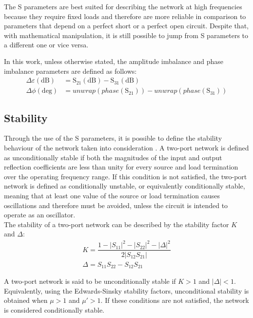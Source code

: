 The S parameters are best suited for describing the network at high frequencies because they require fixed loads and therefore are more reliable in comparison to parameters that depend on a perfect short or a perfect open circuit. Despite that, with mathematical manipulation, it is still possible to jump from S parameters to a different one or vice versa.

In this work, unless otherwise stated, the amplitude imbalance and phase imbalance parameters are defined as follows:
\begin{align}
    \Delta \varepsilon(\mathrm{dB})&=\mathrm{S}_{21}(\mathrm{dB})-\mathrm{S}_{31}(\mathrm{dB})\\
    \label{eq:DiffGainBalanceSports}
    \Delta \phi(\mathrm{deg})&=unwrap(phase(\mathrm{S}_{21}))-unwrap(phase(\mathrm{S}_{31}))
\end{align}

\subsection{Stability}
Through the use of the S parameters, it is possible to define the stability behaviour of the network taken into consideration \cite{Microwave Transistor Amplifiers Analysis and Design}\cite{Pozar2012}.
A two-port network is defined as unconditionally stable if both the magnitudes of the input and output reflection coefficients are less than unity for every source and load termination over the operating frequency range.  
If this condition is not satisfied, the two-port network is defined as conditionally unstable, or equivalently conditionally stable, meaning that at least one value of the source or load termination causes oscillations and therefore must be avoided, unless the circuit is intended to operate as an oscillator.\\

The stability of a two-port network can be described by the stability factor $K$ and $\Delta$:
\begin{align}
    K=\dfrac{1-|S_{11}|^2-|S_{22}|^2-|\Delta|^2}{2|S_{12}S_{21}|}\\
    \Delta=S_{11}S_{22}-S_{12}S_{21}
\end{align}

A two-port network is said to be unconditionally stable if $K>1$ and $|\Delta|<1$.  
Equivalently, using the Edwards-Sinsky stability factors, unconditional stability is obtained when $\mu>1$ and $\mu'>1$.  
If these conditions are not satisfied, the network is considered conditionally stable.\\

